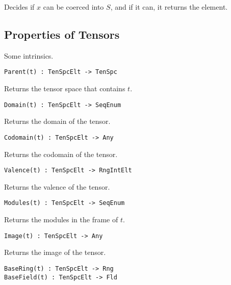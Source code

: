 \documentclass{amsart}
\begin{document}
Decides if $x$ can be coerced into $S$, and if it can, it returns the element.

\subsection{Properties of Tensors}

Some intrinsics.%

\color{blue}
{\small \begin{verbatim}
Parent(t) : TenSpcElt -> TenSpc
\end{verbatim} }
\color{black}

Returns the tensor space that contains $t$. 

\color{blue}
{\small \begin{verbatim}
Domain(t) : TenSpcElt -> SeqEnum
\end{verbatim} }
\color{black}

Returns the domain of the tensor.

\color{blue}
{\small \begin{verbatim}
Codomain(t) : TenSpcElt -> Any
\end{verbatim} }
\color{black}

Returns the codomain of the tensor.

\color{blue}
{\small \begin{verbatim}
Valence(t) : TenSpcElt -> RngIntElt
\end{verbatim} }
\color{black}

Returns the valence of the tensor.

\color{blue}
{\small \begin{verbatim}
Modules(t) : TenSpcElt -> SeqEnum
\end{verbatim} }
\color{black}

Returns the modules in the frame of $t$.

\color{blue}
{\small \begin{verbatim}
Image(t) : TenSpcElt -> Any
\end{verbatim} }
\color{black}

Returns the image of the tensor.

\color{blue}
{\small \begin{verbatim}
BaseRing(t) : TenSpcElt -> Rng
BaseField(t) : TenSpcElt -> Fld
\end{verbatim} }
\color{black}
\end{document}
